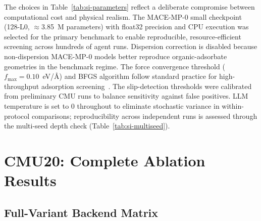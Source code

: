 \documentclass[%
 preprint,
 superscriptaddress,
 amsmath,amssymb,
 aps,
 prb,
 floatfix,
]{revtex4-2}
\begin{document}
The choices in Table~\ref{tab:si-parameters} reflect a deliberate compromise between computational cost and physical realism. The MACE-MP-0 small checkpoint (128-L0, $\approx$3.85~M parameters) with float32 precision and CPU execution was selected for the primary benchmark to enable reproducible, resource-efficient screening across hundreds of agent runs. Dispersion correction is disabled because non-dispersion MACE-MP-0 models better reproduce organic-adsorbate geometries in the benchmark regime. The force convergence threshold ($f_{\mathrm{max}} = 0.10$~eV/\AA) and BFGS algorithm follow standard practice for high-throughput adsorption screening~\cite{chan2023mace}. The slip-detection thresholds were calibrated from preliminary CMU runs to balance sensitivity against false positives. LLM temperature is set to 0 throughout to eliminate stochastic variance in within-protocol comparisons; reproducibility across independent runs is assessed through the multi-seed depth check (Table~\ref{tab:si-multiseed}).



\section{CMU20: Complete Ablation Results}

\subsection{Full-Variant Backend Matrix}
\end{document}
